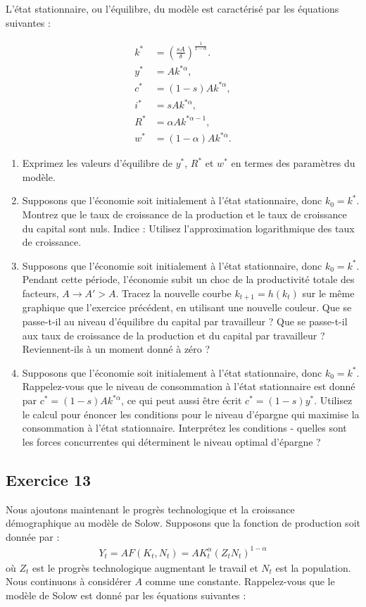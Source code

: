 \documentclass[11pt]{article}
\begin{document}
L'état stationnaire, ou l'équilibre, du modèle est caractérisé par les
équations suivantes :

\begin{align*}
    k^* &= \left(\frac{sA}{\delta}\right)^{\frac{1}{1-\alpha}}. \\
    y^* &= Ak^{* \alpha}, \\
    c^* &= (1 - s)Ak^{* \alpha}, \\
    i^* &= sAk^{* \alpha}, \\
    R^* &= \alpha Ak^{* \alpha - 1}, \\
    w^* &= (1 - \alpha) Ak^{* \alpha}.
\end{align*}

\begin{enumerate}
    \item Exprimez les valeurs d'équilibre de \(y^*\), \(R^*\) et \(w^*\) en termes des
    paramètres du modèle.
    \item Supposons que l'économie soit initialement à l'état stationnaire, donc \(k_0 = k^*\).
    Montrez que le taux de croissance de la production et le taux de croissance du capital sont nuls.
    Indice : Utilisez l'approximation logarithmique des taux de croissance.
    \item Supposons que l'économie soit initialement à l'état stationnaire, donc \(k_0 = k^*\).
    Pendant cette période, l'économie subit un choc de la productivité totale des facteurs,  
    \(A \to A' > A\). 
    Tracez la nouvelle courbe \(k_{t+1} = h(k_t)\) sur le même graphique que l'exercice précédent,
    en utilisant une nouvelle couleur. Que se passe-t-il au niveau d'équilibre du capital par travailleur ?
    Que se passe-t-il aux taux de croissance de la production et du capital par travailleur ?
    Reviennent-ils à un moment donné à zéro ?
    \item Supposons que l'économie soit initialement à l'état stationnaire, donc \(k_0 = k^*\).
    Rappelez-vous que le niveau de consommation à l'état stationnaire est donné par \(c^* = (1 - s)Ak^{* \alpha}\),
    ce qui peut aussi être écrit \(c^* = (1 - s)y^*\).
    Utilisez le calcul pour énoncer les conditions pour le niveau d'épargne qui maximise la consommation à l'état stationnaire.
    Interprétez les conditions - quelles sont les forces concurrentes qui déterminent le niveau optimal d'épargne ?
\end{enumerate}

\subsection*{Exercice 13}
Nous ajoutons maintenant le progrès technologique et la croissance démographique au modèle de Solow.
Supposons que la fonction de production soit donnée par :
\begin{align*}
    Y_t =AF(K_t,N_t)= A K_t^{\alpha} (Z_t N_t)^{1-\alpha}
\end{align*}
où \(Z_t\) est le progrès technologique augmentant le travail et \(N_t\) est la population. 
Nous continuons à considérer \(A\) comme une constante.
Rappelez-vous que le modèle de Solow est donné par les équations suivantes :
\end{document}

